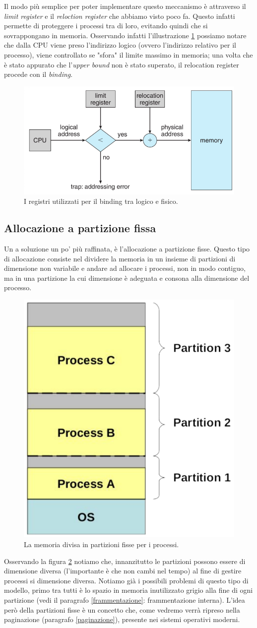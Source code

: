 Il modo più semplice per poter implementare questo meccanismo è attraverso il \textit{limit register} e il \textit{reloction register} che abbiamo visto poco fa. Questo infatti permette di proteggere i processi tra di loro, evitando quindi che si sovrappongano in memoria. Osservando infatti l'illustrazione \ref{fig:relocation_register_allocation} possiamo notare che dalla CPU viene preso l'indirizzo logico (ovvero l'indirizzo relativo per il processo), viene controllato se "sfora" il limite massimo in memoria; una volta che è stato appurato che l'\textit{upper bound} non è stato superato, il relocation register procede con il \textit{binding}.
\begin{figure}[h]
    \centering
    \includegraphics[width = .5\textwidth]{../res/imgs/main memory/relocation_register_allocation.png}
    \caption{I registri utilizzati per il binding tra logico e fisico.}
    \label{fig:relocation_register_allocation}
\end{figure}

% 
\subsection{Allocazione a partizione fissa}\label{partizione_fissa}
Un a soluzione un po' più raffinata, è l'allocazione a partizione fisse. Questo tipo di allocazione consiste nel dividere la memoria in un insieme di partizioni di dimensione non variabile e andare ad allocare i processi, non in modo contiguo, ma in una partizione la cui dimensione è adeguata e consona alla dimensione del processo. 
\begin{figure}[h]
    \centering
    \includegraphics[width = .28\textwidth]{../res/imgs/main memory/fixed_partition.png}
    \caption{La memoria divisa in partizioni fisse per i processi.}
    \label{fig:fixed_partition}
\end{figure}
Osservando la figura \ref{fig:fixed_partition} notiamo che, innanzitutto le partizioni possono essere di dimensione diversa (l'importante è che non cambi nel tempo) al fine di gestire processi si dimensione diversa. Notiamo già i possibili problemi di questo tipo di modello, primo tra tutti è lo spazio in memoria inutilizzato grigio alla fine di ogni partizione (vedi il paragrafo \ref{frammentazione}: frammentazione interna). L'idea però della partizioni fisse è un concetto che, come vedremo verrà ripreso nella paginazione (paragrafo \ref{paginazione}), presente nei sistemi operativi moderni.

